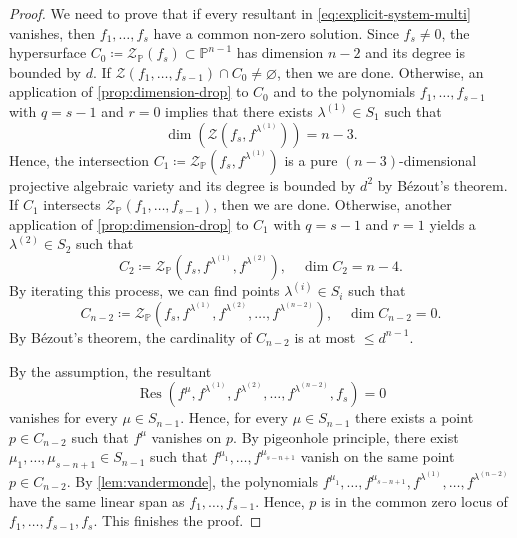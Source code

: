 \documentclass[10pt,a4paper]{amsart}
\newcommand{\PP}{\mathbb{P}}
\DeclareMathOperator{\Res}{Res}
\newcommand{\cZ}{\mathcal{Z}}
\begin{document}
\begin{proof}
We need to prove that if every resultant in \eqref{eq:explicit-system-multi} vanishes, then $f_1,\dots,f_s$ have a common non-zero solution.
Since $f_s\neq 0$, the hypersurface $C_0\coloneqq \cZ_{\PP}(f_s)\subset\PP^{n-1}$ has dimension $n-2$ and its degree is bounded by $d$. 
If $\cZ(f_1,\dots,f_{s-1})\cap C_0\neq\varnothing$, then we are done.
Otherwise, an application of \cref{prop:dimension-drop} to $C_0$ and to the polynomials $f_1,\dots,f_{s-1}$ with $q=s-1$ and $r=0$ implies that there exists $\lambda^{(1)}\in S_1$ such that \[
\dim\left(\cZ(f_s,f^{\lambda^{(1)}})\right) = n-3.
    \] 
    Hence, the intersection $C_1\coloneqq\cZ_{\PP}(f_s,f^{\lambda^{(1)}})$ is a pure $(n-3)$-dimensional projective algebraic variety and its degree is bounded by $d^2$ by B\'{e}zout's theorem.
    If $C_1$ intersects $\cZ_{\PP}(f_1,\dots,f_{s-1})$, then we are done. 
    Otherwise, another application of \cref{prop:dimension-drop} to $C_1$ with $q=s-1$ and $r=1$ yields a $\lambda^{(2)}\in S_2$ such that \[
    C_2\coloneqq \cZ_{\PP}(f_s,f^{\lambda^{(1)}},f^{\lambda^{(2)}}),\quad \dim C_2 = n-4.
    \] By iterating this process, we can find points $\lambda^{(i)}\in S_i$ such that \[
    C_{n-2}\coloneqq \cZ_{\PP}(f_s,f^{\lambda^{(1)}},f^{\lambda^{(2)}},\dots,f^{\lambda^{(n-2)}}),\quad \dim C_{n-2} = 0.
    \] By B\'{e}zout's theorem, the cardinality of $C_{n-2}$ is at most $\leq d^{n-1}$.

    By the assumption, the resultant \[
    \Res(f^{\mu},f^{\lambda^{(1)}},f^{\lambda^{(2)}},\dots,f^{\lambda^{(n-2)}},f_s) = 0
    \] vanishes for every $\mu\in S_{n-1}$.
    Hence, for every $\mu\in S_{n-1}$ there exists a point $p\in C_{n-2}$ such that $f^{\mu}$ vanishes on $p$.
    By pigeonhole principle, there exist $\mu_1,\dots,\mu_{s-n+1}\in S_{n-1}$ such that $f^{\mu_1},\dots,f^{\mu_{s-n+1}}$ vanish on the same point $p\in C_{n-2}$. 
    By \cref{lem:vandermonde},
    the polynomials $f^{\mu_1},\dots,f^{\mu_{s-n+1}}, f^{\lambda^{(1)}},\dots,f^{\lambda^{(n-2)}}$ have the same linear span as $f_1,\dots,f_{s-1}$.
    Hence, $p$ is in the common zero locus of $f_1,\dots,f_{s-1},f_s$.
    This finishes the proof.
\end{proof}
\end{document}
